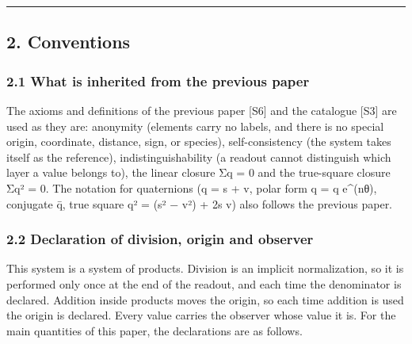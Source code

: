 \documentclass[
  a4paper,
]{article}
\begin{document}
\begin{center}\rule{0.5\linewidth}{0.5pt}\end{center}

\subsection{2. Conventions}\label{conventions}

\subsubsection{2.1 What is inherited from the previous
paper}\label{what-is-inherited-from-the-previous-paper}

The axioms and definitions of the previous paper {[}S6{]} and the
catalogue {[}S3{]} are used as they are: anonymity (elements carry no
labels, and there is no special origin, coordinate, distance, sign, or
species), self-consistency (the system takes itself as the reference),
indistinguishability (a readout cannot distinguish which layer a value
belongs to), the linear closure Σq = 0 and the true-square closure Σq² =
0. The notation for quaternions (q = s + v, polar form q =
\textbar q\textbar{} e\^{}(nθ), conjugate q̄, true square q² = (s² −
\textbar v\textbar²) + 2s v) also follows the previous paper.

\subsubsection{2.2 Declaration of division, origin and
observer}\label{declaration-of-division-origin-and-observer}

This system is a system of products. Division is an implicit
normalization, so it is performed only once at the end of the readout,
and each time the denominator is declared. Addition inside products
moves the origin, so each time addition is used the origin is declared.
Every value carries the observer whose value it is. For the main
quantities of this paper, the declarations are as follows.
\end{document}
